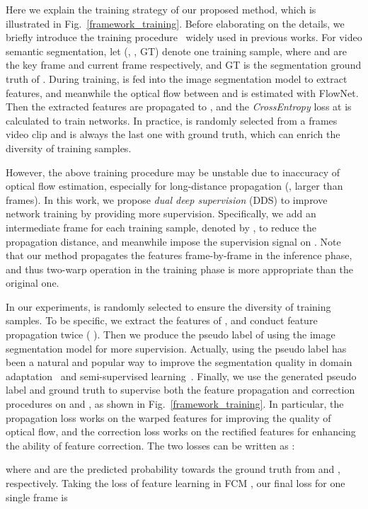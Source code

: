 \documentclass[journal]{IEEEtran}
\begin{document}
Here we explain the training strategy of our proposed method, which is illustrated in Fig.~\ref{framework_training}. Before elaborating on the details, we briefly introduce the training procedure~\cite{zhu2017deep} widely used in previous works. For video semantic segmentation, let (, , GT) denote one training sample, where  and  are the key frame and current frame respectively, and GT is the segmentation ground truth of . During training,  is fed into the image segmentation model to extract features, and meanwhile the optical flow between  and  is estimated with FlowNet. Then the extracted features are propagated to , and the \textit{CrossEntropy} loss at  is calculated to train networks. In practice,  is randomly selected from a  frames video clip and  is always the last one with ground truth, which can enrich the diversity of training samples.

However, the above training procedure may be unstable due to inaccuracy of optical flow estimation, especially for long-distance propagation (\eg, larger than  frames). In this work, we propose \emph{dual deep supervision} (DDS) to improve network training by providing more supervision. Specifically, we add an intermediate frame for each training sample, denoted by , to reduce the propagation distance, and meanwhile impose the supervision signal on . Note that our method propagates the features frame-by-frame in the inference phase, and thus two-warp operation in the training phase is more appropriate than the original one.

In our experiments,   is randomly selected to ensure the diversity of training samples. To be specific, we extract the features of , and conduct feature propagation twice (    ).  Then we produce the pseudo label of  using the image segmentation model for more supervision. Actually, using the pseudo label has been a natural and popular way to improve the segmentation quality in domain adaptation~\cite{zou2018unsupervised} and semi-supervised learning~\cite{hungadversarial}. Finally, we use the generated pseudo label and ground truth to supervise both the feature propagation and correction procedures on  and , as shown in Fig.~\ref{framework_training}. In particular, the propagation loss  works on the warped features  for improving the quality of optical flow, and the correction loss  works on the rectified features  for enhancing the ability of feature correction. The two losses can be written as :


where  and  are the predicted probability towards the ground truth from  and , respectively.
Taking the loss of feature learning in FCM , our final loss for one single frame is
\end{document}
